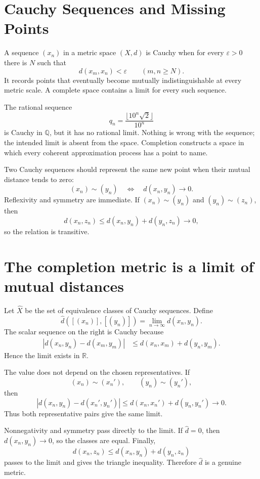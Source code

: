 
\section{Cauchy Sequences and Missing Points}

A sequence \((x_n)\) in a metric space \((X,d)\) is Cauchy when for every \(\varepsilon>0\) there is \(N\) such that
\[
  d(x_m,x_n)<\varepsilon
  \qquad(m,n\ge N).
\]
It records points that eventually become mutually indistinguishable at every metric scale.  A complete space contains a limit for every such sequence.

The rational sequence
\[
  q_n=\frac{\lfloor10^n\sqrt2\rfloor}{10^n}
\]
is Cauchy in \(\mathbb Q\), but it has no rational limit.  Nothing is wrong with the sequence; the intended limit is absent from the space.  Completion constructs a space in which every coherent approximation process has a point to name.

Two Cauchy sequences should represent the same new point when their mutual distance tends to zero:
\[
  (x_n)\sim(y_n)
  \quad\Longleftrightarrow\quad
  d(x_n,y_n)\longrightarrow0.
\]
Reflexivity and symmetry are immediate.  If \((x_n)\sim(y_n)\) and \((y_n)\sim(z_n)\), then
\[
  d(x_n,z_n)
  \le d(x_n,y_n)+d(y_n,z_n)\longrightarrow0,
\]
so the relation is transitive.

\section{The completion metric is a limit of mutual distances}

Let \(\widehat X\) be the set of equivalence classes of Cauchy sequences.  Define
\[
  \widehat d([(x_n)],[(y_n)])
  =\lim_{n\to\infty}d(x_n,y_n).
\]
The scalar sequence on the right is Cauchy because
\[
\begin{aligned}
  |d(x_n,y_n)-d(x_m,y_m)|
  &\le d(x_n,x_m)+d(y_n,y_m).
\end{aligned}
\]
Hence the limit exists in \(\mathbb R\).

The value does not depend on the chosen representatives.  If
\[
  (x_n)\sim(x_n'),
  \qquad
  (y_n)\sim(y_n'),
\]
then
\[
  |d(x_n,y_n)-d(x_n',y_n')|
  \le d(x_n,x_n')+d(y_n,y_n')\longrightarrow0.
\]
Thus both representative pairs give the same limit.

Nonnegativity and symmetry pass directly to the limit.  If \(\widehat d=0\), then \(d(x_n,y_n)\to0\), so the classes are equal.  Finally,
\[
  d(x_n,z_n)
  \le d(x_n,y_n)+d(y_n,z_n)
\]
passes to the limit and gives the triangle inequality.  Therefore \(\widehat d\) is a genuine metric.

